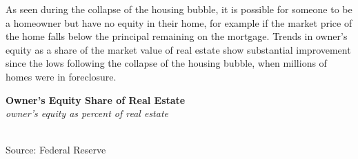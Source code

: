 \documentclass{report}
\makeatletter
\newcommand{\tbllink}[1]{\href{https://raw.githubusercontent.com/bdecon/US-chartbook/master/chartbook/data/#1}{\faTable}}
\newcommand*\short[1]{\expandafter\@gobbletwo\number\numexpr#1\relax}
\newcommand{\shdateaxisticks}{
		date coordinates in=x, axis line style={draw=none},
		xmax={2021-05-15},
		max space between ticks=40,	    
		xtick={{1990-01-01}, {1995-01-01}, {2000-01-01}, 
			{2005-01-01}, {2010-01-01}, {2015-01-01}, {2020-01-01}},
		minor xtick={},
		enlarge y limits={0.06}, enlarge x limits={0.01},
		}
\newcommand{\stdline}[4]{\addplot[very thick, no markers, color=#1] 
		table [x=#2, y=#3, col sep=comma] {#4};	}
\newcommand{\rbars}{
		\fill[color=black!10] (axis cs:{1990-07-01},\pgfkeysvalueof{/pgfplots/ymin}) rectangle 
			(axis cs:{1991-03-01}, \pgfkeysvalueof{/pgfplots/ymax});
		\fill[color=black!10] (axis cs:{2007-12-01},\pgfkeysvalueof{/pgfplots/ymin}) rectangle 
			(axis cs:{2009-07-01}, \pgfkeysvalueof{/pgfplots/ymax});
		\fill[color=black!10] (axis cs:{2001-03-01},\pgfkeysvalueof{/pgfplots/ymin}) rectangle 
			(axis cs:{2001-11-01}, \pgfkeysvalueof{/pgfplots/ymax});
		\fill[color=black!10] (axis cs:{2020-02-01},\pgfkeysvalueof{/pgfplots/ymin}) rectangle 
			(axis cs:{2021-05-15}, \pgfkeysvalueof{/pgfplots/ymax});}
\makeatother
\begin{document}
{\begin{minipage}{0.76\textwidth}
As seen during the collapse of the housing bubble, it is possible for someone to be a homeowner but have no equity in their home, for example if the market price of the home falls below the principal remaining on the mortgage. Trends in owner's equity as a share of the market value of real estate show substantial improvement since the lows following the collapse of the housing bubble, when millions of homes were in foreclosure. 
\end{minipage}
\vspace{1mm}

\begin{minipage}{0.29\textwidth}
\small 
\end{minipage}\hspace{7mm}
\begin{minipage}{0.46\textwidth}
\normalsize \textbf{Owner's Equity Share of Real Estate}\\
\footnotesize{\textit{owner's equity as percent of real estate}}\\
\hspace*{-2mm} \\
\footnotesize{Source: Federal Reserve} \hspace{30mm} \tbllink{homeeq.csv} 

\end{minipage}
\newpage
\begin{minipage}{0.76\textwidth}

\end{minipage}}
\end{document}
